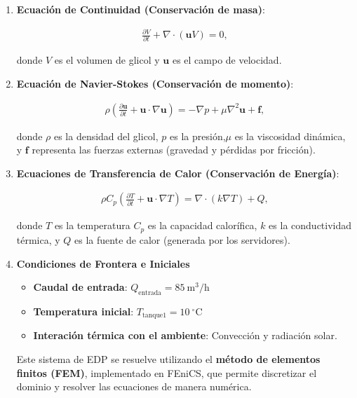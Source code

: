 \documentclass[12pt, a4paper]{article}
\begin{document}
\begin{enumerate}
\item[1.] \textbf{Ecuación de Continuidad (Conservación de masa)}:

\begin{align*}
\frac{\partial V}{\partial t}+\nabla\cdot(\textbf{u}V)=0,
\end{align*}

donde $V$ es el volumen de glicol y $\textbf{u}$ es el campo de velocidad.


\item[2.] \textbf{Ecuación de Navier-Stokes (Conservación de momento)}:

\begin{align*}
\rho\left(\frac{\partial \textbf{u}}{\partial t}+\textbf{u}\cdot\nabla \textbf{u} \right)=-\nabla p+\mu \nabla^2\textbf{u}+\textbf{f},
\end{align*}

donde $\rho$  es la densidad del glicol, $p$ es la presión,$\mu$ es la viscosidad dinámica, y $\textbf{f}$ representa las fuerzas externas (gravedad y pérdidas por fricción).

\item[3.] \textbf{Ecuaciones de Transferencia de Calor (Conservación de Energía)}:

\begin{align*}
\rho C_p\left(\frac{\partial T}{\partial t}+\textbf{u}\cdot\nabla T \right)=\nabla \cdot (k\nabla T)+Q,
\end{align*}

donde $T$ es la temperatura $C_p$ es la capacidad calorífica, $k$ es la conductividad térmica, y $Q$ es la fuente de calor (generada por los servidores).

\item[4.] \textbf{Condiciones de Frontera e Iniciales}

\begin{itemize}
\item \textbf{Caudal de entrada}: $Q_\text{entrada}=85~\text{m}^3\text{/h}$
\item \textbf{Temperatura inicial}: $T_\text{tanque1}=10~^\circ\text{C}$
\item \textbf{Interación térmica con el ambiente}: Convección y radiación solar.
\end{itemize}

Este sistema de EDP se resuelve utilizando el \textbf{método de elementos finitos (FEM)}, implementado en FEniCS, que permite discretizar el dominio y resolver las ecuaciones de manera numérica.

\end{enumerate}
\end{document}
